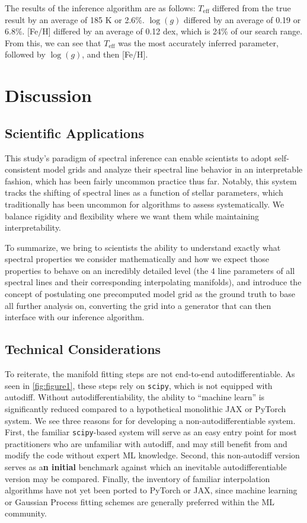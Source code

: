 \documentclass[twocolumn, linenumbers]{aastex631}
\begin{document}
The results of the inference algorithm are as follows: $T_{\mathrm{eff}}$ differed from the true result by an average of 185 K or 2.6\%.
$\log(g)$ differed by an average of 0.19 or 6.8\%. [Fe/H] differed by an average of 0.12 dex, which is 24\% of our search range.
From this, we can see that $T_{\mathrm{eff}}$ was the most accurately inferred parameter, followed by $\log(g)$, and then [Fe/H].

\section{Discussion}
\subsection{Scientific Applications}
This study's paradigm of spectral inference can enable scientists to adopt self-consistent model grids and analyze their spectral line behavior in an interpretable fashion, which has been fairly uncommon practice thus far.
Notably, this system tracks the shifting of spectral lines as a function of stellar parameters, which traditionally has been uncommon for algorithms to assess systematically.
We balance rigidity and flexibility where we want them while maintaining interpretability.

To summarize, we bring to scientists the ability to understand exactly what spectral properties we consider mathematically and how we expect those properties to behave on an incredibly detailed level (the 4 line parameters of all spectral lines and their corresponding interpolating manifolds), and introduce the concept of postulating one precomputed model grid as the ground truth to base all further analysis on, converting the grid into a generator that can then interface with our inference algorithm.

\subsection{Technical Considerations}
To reiterate, the manifold fitting steps are not end-to-end autodifferentiable.
As seen in \autoref{fig:figure1}, these steps rely on \texttt{scipy}, which is not equipped with autodiff.
Without autodifferentiability, the ability to ``machine learn'' is significantly reduced compared to a hypothetical monolithic JAX or PyTorch system.
We see three reasons for for developing a non-autodifferentiable system.
First, the familiar \texttt{scipy}-based system will serve as an easy entry point for most practitioners who are unfamiliar with autodiff, and may still benefit from and modify the code without expert ML knowledge.
Second, this non-autodiff version serves as a\textbf{n initial} benchmark against which an inevitable autodifferentiable version may be compared.
Finally, the inventory of familiar interpolation algorithms have not yet been ported to PyTorch or JAX, since machine learning or Gaussian Process fitting schemes are generally preferred within the ML community.
\end{document}
